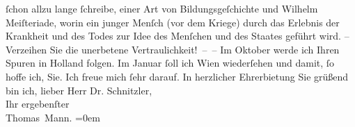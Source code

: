 \begin{ledgroupsized}[t]{13cm}
               ſchon {\pb}allzu lange ſchreibe, einer Art von
               Bildungsgeſchichte und Wilhelm
                  Meiſteriade, worin ein junger Menſch (vor dem Kriege) durch das Erlebnis der
               Krankheit und des Todes zur Idee des Menſchen und des Staates geführt wird. –
               Verzeihen Sie die unerbetene Vertraulichkeit! – –\pend
           \pstart
           Im Oktober werde ich Ihren Spuren in Holland folgen. Im Januar{ }ſoll ich Wien
               wiederſehen und damit, ſo hoffe ich, Sie. Ich freue mich ſehr darauf.\pend
           \pstart
           In herzlicher Ehrerbietung Sie grüßend bin ich, lieber Herr Dr.
               Schnitzler,{\\[\baselineskip]}Ihr ergebenſter{\\[\baselineskip]}\spacefill\mbox{Thomas Mann.}\pend
           \leftskip=0em{}
         
         \endnumbering{}\end{ledgroupsized}  \newcommand{\dateiname}{L02392}\newcommand{\titel}{Thomas Mann an Arthur Schnitzler, 4. 9. 1922}\newcommand{\editorInnen}{Martin Anton Müller und Gerd-Hermann Susen}
      